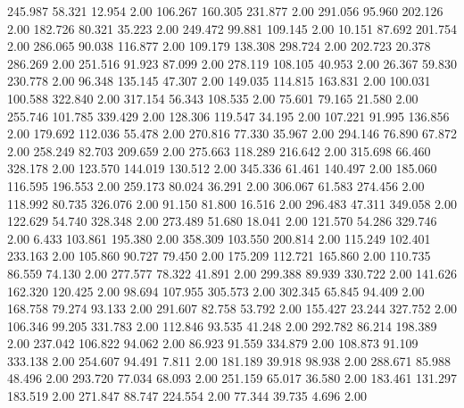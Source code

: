  245.987   58.321   12.954         2.00
 106.267  160.305  231.877         2.00
 291.056   95.960  202.126         2.00
 182.726   80.321   35.223         2.00
 249.472   99.881  109.145         2.00
  10.151   87.692  201.754         2.00
 286.065   90.038  116.877         2.00
 109.179  138.308  298.724         2.00
 202.723   20.378  286.269         2.00
 251.516   91.923   87.099         2.00
 278.119  108.105   40.953         2.00
  26.367   59.830  230.778         2.00
  96.348  135.145   47.307         2.00
 149.035  114.815  163.831         2.00
 100.031  100.588  322.840         2.00
 317.154   56.343  108.535         2.00
  75.601   79.165   21.580         2.00
 255.746  101.785  339.429         2.00
 128.306  119.547   34.195         2.00
 107.221   91.995  136.856         2.00
 179.692  112.036   55.478         2.00
 270.816   77.330   35.967         2.00
 294.146   76.890   67.872         2.00
 258.249   82.703  209.659         2.00
 275.663  118.289  216.642         2.00
 315.698   66.460  328.178         2.00
 123.570  144.019  130.512         2.00
 345.336   61.461  140.497         2.00
 185.060  116.595  196.553         2.00
 259.173   80.024   36.291         2.00
 306.067   61.583  274.456         2.00
 118.992   80.735  326.076         2.00
  91.150   81.800   16.516         2.00
 296.483   47.311  349.058         2.00
 122.629   54.740  328.348         2.00
 273.489   51.680   18.041         2.00
 121.570   54.286  329.746         2.00
   6.433  103.861  195.380         2.00
 358.309  103.550  200.814         2.00
 115.249  102.401  233.163         2.00
 105.860   90.727   79.450         2.00
 175.209  112.721  165.860         2.00
 110.735   86.559   74.130         2.00
 277.577   78.322   41.891         2.00
 299.388   89.939  330.722         2.00
 141.626  162.320  120.425         2.00
  98.694  107.955  305.573         2.00
 302.345   65.845   94.409         2.00
 168.758   79.274   93.133         2.00
 291.607   82.758   53.792         2.00
 155.427   23.244  327.752         2.00
 106.346   99.205  331.783         2.00
 112.846   93.535   41.248         2.00
 292.782   86.214  198.389         2.00
 237.042  106.822   94.062         2.00
  86.923   91.559  334.879         2.00
 108.873   91.109  333.138         2.00
 254.607   94.491    7.811         2.00
 181.189   39.918   98.938         2.00
 288.671   85.988   48.496         2.00
 293.720   77.034   68.093         2.00
 251.159   65.017   36.580         2.00
 183.461  131.297  183.519         2.00
 271.847   88.747  224.554         2.00
  77.344   39.735    4.696         2.00
